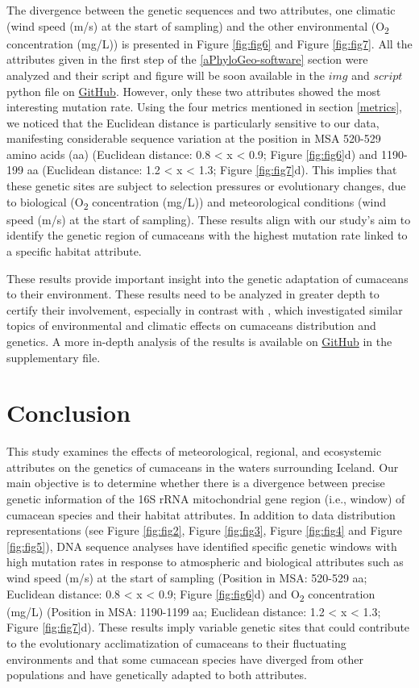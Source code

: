 The divergence between the genetic sequences and two attributes, one climatic (wind speed (m/s) at the start of sampling) and the other environmental (O\textsubscript{2} concentration (mg/L)) is presented in Figure \ref{fig:fig6} and Figure \ref{fig:fig7}. All the attributes given in the first step of the \autoref{aPhyloGeo-software} section were analyzed and their script and figure will be soon available in the $img$ and $script$ python file on \href{https://github.com/tahiri-lab/Cumacea_aPhyloGeo}{GitHub}. However, only these two attributes showed the most interesting mutation rate. Using the four metrics mentioned in section \autoref{metrics}, we noticed that the Euclidean distance is particularly sensitive to our data, manifesting considerable sequence variation at the position in MSA 520-529 amino acids (aa) (Euclidean distance: 0.8 < x < 0.9; Figure \ref{fig:fig6}d) and 1190-199 aa (Euclidean distance: 1.2 < x < 1.3; Figure \ref{fig:fig7}d). This implies that these genetic sites are subject to selection pressures or evolutionary changes, due to biological (O\textsubscript{2} concentration (mg/L)) and meteorological conditions (wind speed (m/s) at the start of sampling). These results align with our study's aim to identify the genetic region of cumaceans with the highest mutation rate linked to a specific habitat attribute.

These results provide important insight into the genetic adaptation of cumaceans to their environment. These results need to be analyzed in greater depth to certify their involvement, especially in contrast with \citep{uhlir_adding_2021}, which investigated similar topics of environmental and climatic effects on cumaceans distribution and genetics. A more in-depth analysis of the results is available on \href{https://github.com/tahiri-lab/Cumacea_aPhyloGeo}{GitHub} in the supplementary file.

\section{Conclusion}\label{conclusion}
This study examines the effects of meteorological, regional, and ecosystemic attributes on the genetics of cumaceans in the waters surrounding Iceland. Our main objective is to determine whether there is a divergence between precise genetic information of the 16S rRNA mitochondrial gene region (i.e., window) of cumacean species and their habitat attributes. In addition to data distribution representations (see Figure \ref{fig:fig2}, Figure \ref{fig:fig3}, Figure \ref{fig:fig4} and Figure \ref{fig:fig5}), DNA sequence analyses have identified specific genetic windows with high mutation rates in response to atmospheric and biological attributes such as wind speed (m/s) at the start of sampling (Position in MSA: 520-529 aa; Euclidean distance: 0.8 < x < 0.9; Figure \ref{fig:fig6}d) and O\textsubscript{2} concentration (mg/L) (Position in MSA: 1190-1199 aa; Euclidean distance: 1.2 < x < 1.3; Figure \ref{fig:fig7}d). These results imply variable genetic sites that could contribute to the evolutionary acclimatization of cumaceans to their fluctuating environments and that some cumacean species have diverged from other populations and have genetically adapted to both attributes.

